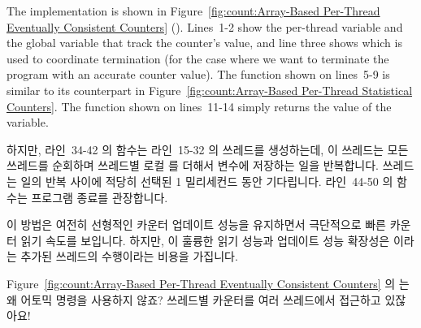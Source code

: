 The implementation is shown in
Figure~\ref{fig:count:Array-Based Per-Thread Eventually Consistent Counters}
().
Lines~1-2 show the per-thread variable and the global variable that
track the counter's value, and line three shows 
which is used to coordinate termination (for the case where we want
to terminate the program with an accurate counter value).
The  function shown on lines~5-9 is similar to its
counterpart in
Figure~\ref{fig:count:Array-Based Per-Thread Statistical Counters}.
The  function shown on lines~11-14 simply returns the
value of the  variable.
\fi

하지만, 라인~34-42 의  함수는 라인~15-32 의 
쓰레드를 생성하는데, 이 쓰레드는 모든 쓰레드를 순회하며 쓰레드별 로컬
 를 더해서  변수에 저장하는 일을 반복합니다.
 쓰레드는 일의 반복 사이에 적당히 선택된 1 밀리세컨드 동안
기다립니다.
라인~44-50 의  함수는 프로그램 종료를 관장합니다.

이 방법은 여전히 선형적인 카운터 업데이트 성능을 유지하면서 극단적으로 빠른
카운터 읽기 속도를 보입니다.
하지만, 이 훌륭한 읽기 성능과 업데이트 성능 확장성은  이라는
추가된 쓰레드의 수행이라는 비용을 가집니다.

\QuickQuiz{}
	Figure~\ref{fig:count:Array-Based Per-Thread Eventually Consistent
	Counters} 의  는 왜 어토믹 명령을 사용하지 않죠?
	쓰레드별 카운터를 여러 쓰레드에서 접근하고 있잖아요!
	\iffalse

